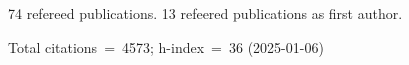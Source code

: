 74 refereed publications. 13 refeered publications as first author.

Total citations~=~4573; h-index~=~36 (2025-01-06)